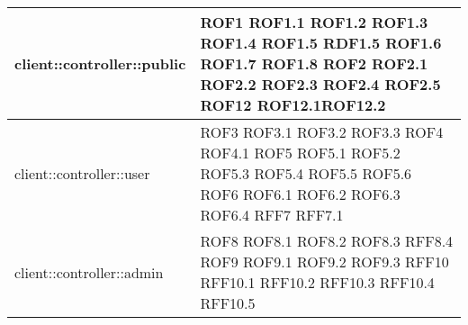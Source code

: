 \begin{center}
\begin{longtable}{| p{9cm} | p{4cm} |}
client::controller::public  &  ROF1 \newline ROF1.1 \newline ROF1.2 \newline ROF1.3 \newline ROF1.4 \newline ROF1.5 \newline RDF1.5 \newline ROF1.6 \newline ROF1.7 \newline ROF1.8 \newline ROF2 \newline ROF2.1 \newline ROF2.2 \newline ROF2.3 \newline ROF2.4 \newline ROF2.5 \newline ROF12 \newline ROF12.1\newline ROF12.2  \newline \\
\hline
client::controller::user  &  ROF3 \newline ROF3.1 \newline ROF3.2 \newline ROF3.3 \newline ROF4 \newline ROF4.1 \newline ROF5 \newline ROF5.1 \newline ROF5.2 \newline ROF5.3 \newline ROF5.4 \newline ROF5.5  \newline ROF5.6 \newline ROF6 \newline ROF6.1 \newline ROF6.2 \newline ROF6.3 \newline ROF6.4 \newline RFF7 \newline RFF7.1 \newline \\
\hline
client::controller::admin  &  ROF8 \newline ROF8.1 \newline ROF8.2 \newline ROF8.3 \newline RFF8.4 \newline ROF9 \newline ROF9.1 \newline ROF9.2 \newline ROF9.3 \newline RFF10 \newline RFF10.1 \newline RFF10.2 \newline RFF10.3 \newline RFF10.4 \newline RFF10.5 \newline \\

\end{longtable}
\end{center}
